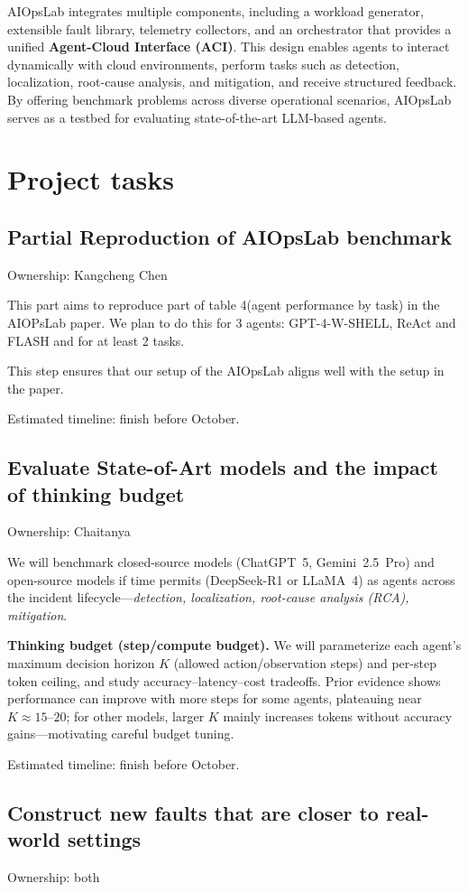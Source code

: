 \documentclass[conference]{IEEEtran}
\begin{document}
AIOpsLab integrates multiple components, including a workload generator, extensible fault library, telemetry collectors, and an orchestrator that provides a unified \textbf{Agent-Cloud Interface (ACI)}. This design enables agents to interact dynamically with cloud environments, perform tasks such as detection, localization, root-cause analysis, and mitigation, and receive structured feedback. By offering benchmark problems across diverse operational scenarios, AIOpsLab serves as a testbed for evaluating state-of-the-art LLM-based agents.

\section{Project tasks}
\subsection{Partial Reproduction of AIOpsLab benchmark}
Ownership: Kangcheng Chen

This part aims to reproduce part of table 4(agent performance by task) in the AIOPsLab paper. We plan to do this for 3 agents: GPT-4-W-SHELL, ReAct and FLASH and for at least 2 tasks.

This step ensures that our setup of the AIOpsLab aligns well with the setup in the paper.

Estimated timeline: finish before October. 
\subsection{Evaluate State-of-Art models and the impact of thinking budget}
Ownership: Chaitanya

We will benchmark closed-source models (ChatGPT~5, Gemini~2.5~Pro) and open-source models if time permits (DeepSeek-R1 or LLaMA~4) as agents across the incident lifecycle—\emph{detection, localization, root-cause analysis (RCA), mitigation}.

\textbf{Thinking budget (step/compute budget).} We will parameterize each agent’s maximum decision horizon $K$ (allowed action/observation steps) and per-step token ceiling, and study accuracy–latency–cost tradeoffs. Prior evidence shows performance can improve with more steps for some agents, plateauing near $K\!\approx\!15$–$20$; for other models, larger $K$ mainly increases tokens without accuracy gains—motivating careful budget tuning.

Estimated timeline: finish before October. 
\subsection{Construct new faults that are closer to real-world settings}
Ownership: both 
\end{document}
